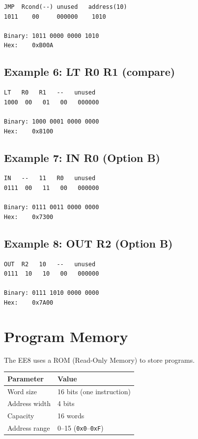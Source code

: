 \documentclass[11pt,a4paper]{article}
\begin{document}
\begin{lstlisting}[language={}]
JMP  Rcond(--) unused   address(10)
1011    00     000000    1010

Binary: 1011 0000 0000 1010
Hex:    0xB00A
\end{lstlisting}

\subsection{Example 6: LT R0 R1 (compare)}

\begin{lstlisting}[language={}]
LT   R0   R1   --   unused
1000  00   01   00   000000

Binary: 1000 0001 0000 0000
Hex:    0x8100
\end{lstlisting}

\subsection{Example 7: IN R0 (Option B)}

\begin{lstlisting}[language={}]
IN   --   11   R0   unused
0111  00   11   00   000000

Binary: 0111 0011 0000 0000
Hex:    0x7300
\end{lstlisting}

\subsection{Example 8: OUT R2 (Option B)}

\begin{lstlisting}[language={}]
OUT  R2   10   --   unused
0111  10   10   00   000000

Binary: 0111 1010 0000 0000
Hex:    0x7A00
\end{lstlisting}

\section{Program Memory}

The EE8 uses a ROM (Read-Only Memory) to store programs.

\begin{table}[H]
\centering
\begin{tabular}{@{}ll@{}}
\toprule
\textbf{Parameter} & \textbf{Value} \\
\midrule
Word size      & 16 bits (one instruction) \\
Address width  & 4 bits \\
Capacity       & 16 words \\
Address range  & 0--15 (\texttt{0x0}--\texttt{0xF}) \\
\bottomrule
\end{tabular}
\end{table}
\end{document}
